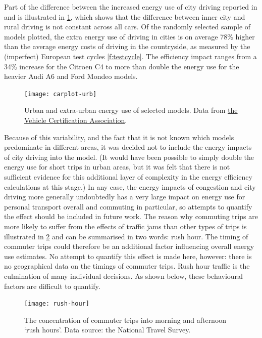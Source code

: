 Part of the difference between the increased energy use of city driving
reported in  \citet{Pelkmans2006} and \citet{Vlieger2000}
is illustrated in \cref{fcarplot-urb}, which shows that the
difference between inner
city and rural driving is not constant across all cars. Of the randomly
selected sample of models plotted, the extra energy use of driving in
cities is on average 78\% higher than the average energy costs of driving
in the countryside, as measured by the (imperfect) European test
cycles \cref{f:testcycle}. The efficiency impact ranges from a
34\% increase for the
Citroen C4 to more than double the energy use for the heavier
Audi A6 and Ford Mondeo models.

\begin{figure}[h]
  \centerline{
    \texttt{[image: carplot-urb]}}
  \caption[Urban and extra-urban energy use of selected models]
  {Urban and extra-urban energy use of selected models.
  Data from \href{http://www.vcacarfueldata.org.uk/downloads/latest.asp}
  {the Vehicle Certification Association}.}
  \label{fcarplot-urb}
\end{figure}

Because of this variability, and the fact that it is not known which models
predominate in different areas, it was decided not to include the
energy impacts of city driving into the model.
(It would have been possible to simply double the energy use for
short trips in urban areas, but it was felt that there is not sufficient
evidence for this additional layer of complexity in the energy
efficiency calculations at this stage.)
In any case, the energy impacts of congestion and city driving
more generally undoubtedly has a very large impact on energy use for personal
transport overall and commuting in particular, so attempts to quantify the effect
should be included in future work. The reason why commuting trips are
more likely to suffer from the effects of traffic jams than other
types of trips is illustrated in \cref{frushhour} and can be summarised
in two words: rush hour. The timing of commuter trips could therefore be
an additional factor influencing overall energy use estimates. No attempt to
quantify this effect is made here, however: there is no geographical data on
the timings of commuter trips. Rush hour traffic is the culmination of many
individual decisions. As shown below, these behavioural factors are difficult
to quantify.

\begin{figure}[h]
  \centerline{
    \texttt{[image: rush-hour]}}
  \caption[The commuting `rush hours']
  {The concentration of commuter trips into morning
  and afternoon `rush hours'. Data source: the National Travel Survey.}
  \label{frushhour}
\end{figure}

